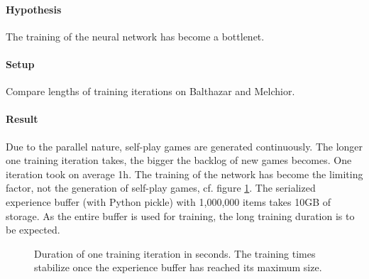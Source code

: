 \paragraph{Hypothesis} The training of the neural network has become a bottlenet.
\paragraph{Setup} Compare lengths of training iterations on Balthazar and Melchior.

\paragraph{Result} Due to the parallel nature, self-play games are generated continuously. The longer one training iteration takes, the bigger the backlog of new games becomes. One iteration took on average 1h. The training of the network has become the limiting factor, not the generation of self-play games, cf. figure \ref{iteration_duration}. The serialized experience buffer (with Python pickle) with 1,000,000 items takes 10GB of storage. As the entire buffer is used for training, the long training duration is to be expected.

\begin{figure}[!h]
    \centering
    \hfill
    \caption{Duration of one training iteration in seconds. The training times stabilize once the experience buffer has reached its maximum size.}
    \label{iteration_duration}
\end{figure}